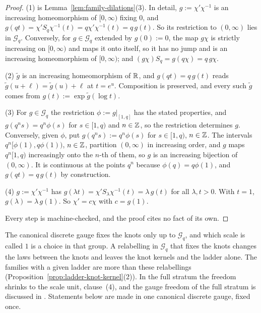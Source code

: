 \begin{proof}
\leanok
{}
(1) is Lemma~\ref{lem:family-dilations}(3). In detail, $g := \chi'\chi^{-1}$ is an increasing
homeomorphism of $[0,\infty)$ fixing $0$, and $g(qt) = \chi'S_q\chi^{-1}(t) = q\chi'\chi^{-1}(t) =
q\,g(t)$. So its restriction to $(0,\infty)$ lies in $\mathcal{G}_q$. Conversely, for
$g \in \mathcal{G}_q$ extended by $g(0) := 0$, the map $g\chi$ is strictly increasing on
$[0,\infty)$ and maps it onto itself, so it has no jump and is an increasing homeomorphism of
$[0,\infty)$; and $(g\chi)S_q = g(q\chi) = q\,g\chi$.

(2) $\tilde g$ is an increasing homeomorphism of $\mathbb{R}$, and $g(qt) = q\,g(t)$ reads
$\tilde g(u + \ell) = \tilde g(u) + \ell$ at $t = e^u$. Composition is preserved, and every such
$\tilde g$ comes from $g(t) := \exp\tilde g(\log t)$.

(3) For $g \in \mathcal{G}_q$ the restriction $\phi := g|_{[1,q]}$ has the stated properties, and
$g(q^ns) = q^n\phi(s)$ for $s \in [1,q)$ and $n \in \mathbb{Z}$, so the restriction determines $g$.
Conversely, given $\phi$, put $g(q^ns) := q^n\phi(s)$ for $s \in [1,q)$, $n \in \mathbb{Z}$. The intervals
$q^n[\phi(1), q\phi(1))$, $n \in \mathbb{Z}$, partition $(0,\infty)$ in increasing order, and $g$ maps
$q^n[1,q)$ increasingly onto the $n$-th of them, so $g$ is an increasing bijection of $(0,\infty)$.
It is continuous at the points $q^n$ because $\phi(q) = q\phi(1)$, and $g(qt) = q\,g(t)$ by
construction.

(4) $g := \chi'\chi^{-1}$ has $g(\lambda t) = \chi'S_\lambda\chi^{-1}(t) = \lambda\,g(t)$ for all
$\lambda, t > 0$. With $t = 1$, $g(\lambda) = \lambda\,g(1)$. So $\chi' = c\chi$ with $c = g(1)$.

Every step is machine-checked, and the proof cites no fact of its own.
\end{proof}

The canonical discrete gauge fixes the knots only up to $\mathcal{G}_q$, and which scale is called
$1$ is a choice in that group. A relabelling in $\mathcal{G}_q$ that fixes the knots changes the
laws between the knots and leaves the knot kernels and the ladder alone. The families with a given
ladder are more than these relabellings (Proposition~\ref{prop:ladder-knot-kernel}(2)). In the full
stratum the freedom shrinks to the scale unit, clause~(4), and the gauge freedom of the full
stratum is discussed in . Statements below are made
in one canonical discrete gauge, fixed once.

